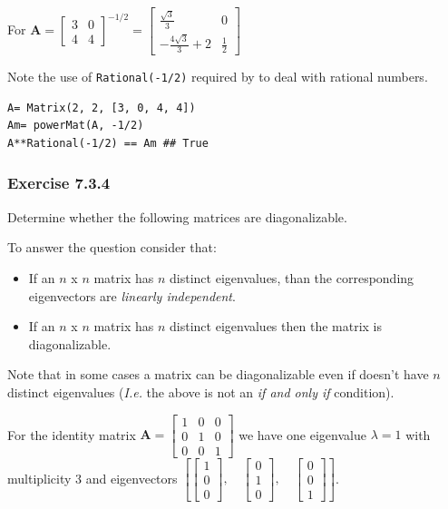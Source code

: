 For $\mathbf{A} = \left[\begin{matrix}3 & 0\\4 & 4\end{matrix}\right] ^ {-1/2} =
\left[\begin{matrix}\frac{\sqrt{3}}{3} & 0\\- \frac{4 \sqrt{3}}{3} + 2 & \frac{1}{2}\end{matrix}\right]$

Note the use of \texttt{Rational(-1/2)} required by \sympy to deal with rational
numbers.

\begin{verbatim}
A= Matrix(2, 2, [3, 0, 4, 4])
Am= powerMat(A, -1/2)
A**Rational(-1/2) == Am ## True
\end{verbatim}

\subsubsection{Exercise 7.3.4}

Determine whether the following matrices are diagonalizable.

To answer the question consider that:

\begin{itemize}
\item If an $n$ x $n$ matrix has $n$ distinct eigenvalues, than the corresponding
eigenvectors are \emph{linearly independent}.

\item If an $n$ x $n$ matrix has $n$ distinct eigenvalues then the matrix is diagonalizable.
\end{itemize}

Note that in some cases a matrix can be diagonalizable even if doesn't have $n$ distinct eigenvalues
(\emph{I.e.} the above is not an \emph{if and only if} condition).

For the identity matrix $\mathbf{A} = \left[\begin{matrix}1 & 0 & 0\\0 & 1 & 0\\0 & 0 & 1\end{matrix}\right]$
we have one eigenvalue $\lambda = 1$ with multiplicity 3 and eigenvectors
$\left [ \left[\begin{matrix}1\\0\\0\end{matrix}\right], \quad \left[\begin{matrix}0\\1\\0\end{matrix}\right], \quad \left[\begin{matrix}0\\0\\1\end{matrix}\right]\right ]$.

